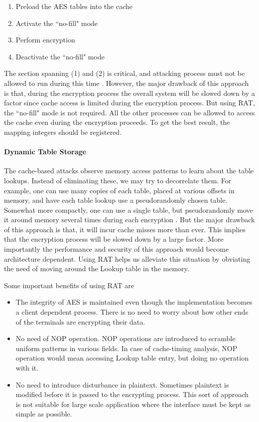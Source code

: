 \begin{enumerate}
\item Preload the AES tables into the cache
\item Activate the ``no-fill" mode
\item Perform encryption
\item Deactivate the ``no-fill" mode
\end{enumerate}

The section spanning (1) and (2) is critical, and attacking process must not be allowed to run during this time \citep{osvik}. However, the major drawback of this approach is that, during the encryption process the overall system will be slowed down by a factor since cache access is limited during the encryption process. But using RAT, the ``no-fill" mode is not required. All the other processes can be allowed to access the cache even during the encryption proceeds. To get the best result, the mapping integers should be registered.\\

\paragraph{Dynamic Table Storage}
The cache-based attacks observe memory access patterns to learn about the table lookups. Instead of eliminating these, we may try to decorrelate them. For example, one can use many copies of each table, placed at various offsets in memory, and have each table lookup use a pseudorandomly chosen table. Somewhat more compactly, one can use a single table, but pseudorandomly move it around memory several times during each encryption \citep{osvik}. But the major drawback of this approach is that, it will incur cache misses more than ever. This implies that the encryption process will be slowed down by a large factor. More importantly the performance and security of this approach would become architecture dependent. Using RAT helps us alleviate this situation by obviating the need of moving around the Lookup table in the memory.

Some important benefits of using RAT are
\begin{itemize}
\item The integrity of AES is maintained even though the implementation becomes a client dependent process. There is no need to worry about how other ends of the terminals are encrypting their data.

\item No need of NOP operation. NOP operations are introduced to scramble uniform patterns in various fields. In case of cache-timing analysis, NOP operation would mean accessing Lookup table entry, but doing no operation with it.

\item No need to introduce disturbance in plaintext. Sometimes plaintext is modified before it is passed to the encrypting process. This sort of approach is not suitable for large scale application where the interface must be kept as simple as possible.

\end{itemize}
